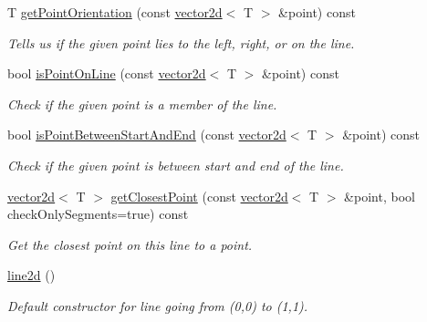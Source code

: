 \begin{DoxyCompactItemize}
T \hyperlink{classirr_1_1core_1_1line2d_a85405d08c6e3ea55cdb39b60484f7275}{get\+Point\+Orientation} (const \hyperlink{classirr_1_1core_1_1vector2d}{vector2d}$<$ T $>$ \&point) const
\begin{DoxyCompactList}\small\item\em Tells us if the given point lies to the left, right, or on the line. \end{DoxyCompactList}\item 
bool \hyperlink{classirr_1_1core_1_1line2d_a00fcd43ae43b8b7e249b32206aaa22ff}{is\+Point\+On\+Line} (const \hyperlink{classirr_1_1core_1_1vector2d}{vector2d}$<$ T $>$ \&point) const
\begin{DoxyCompactList}\small\item\em Check if the given point is a member of the line. \end{DoxyCompactList}\item 
bool \hyperlink{classirr_1_1core_1_1line2d_a5c986f9749f57364757f0f6c749922ce}{is\+Point\+Between\+Start\+And\+End} (const \hyperlink{classirr_1_1core_1_1vector2d}{vector2d}$<$ T $>$ \&point) const
\begin{DoxyCompactList}\small\item\em Check if the given point is between start and end of the line. \end{DoxyCompactList}\item 
\hyperlink{classirr_1_1core_1_1vector2d}{vector2d}$<$ T $>$ \hyperlink{classirr_1_1core_1_1line2d_af049709fbc870bdc317ec27df95280cb}{get\+Closest\+Point} (const \hyperlink{classirr_1_1core_1_1vector2d}{vector2d}$<$ T $>$ \&point, bool check\+Only\+Segments=true) const
\begin{DoxyCompactList}\small\item\em Get the closest point on this line to a point. \end{DoxyCompactList}\item 
\mbox{\label{classirr_1_1core_1_1line2d_a7d0f25f93572eb73734da83da8490410}} 
\hyperlink{classirr_1_1core_1_1line2d_a7d0f25f93572eb73734da83da8490410}{line2d} ()
\begin{DoxyCompactList}\small\item\em Default constructor for line going from (0,0) to (1,1). \end{DoxyCompactList}\item 
\mbox{\label{classirr_1_1core_1_1line2d_af9614350cdb0527c190dcf3342ecb42e}} 

\end{DoxyCompactItemize}
